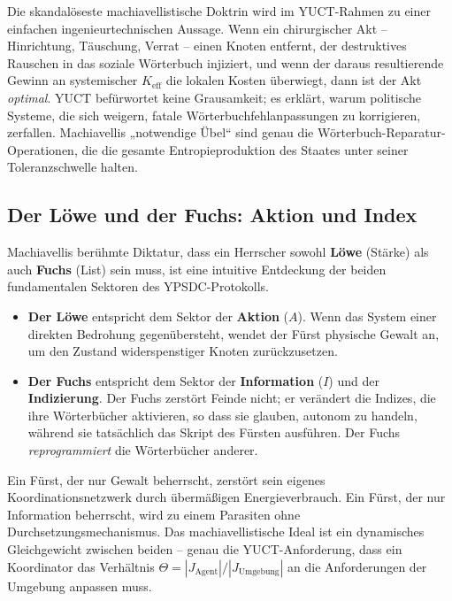 \documentclass[12pt,a4paper]{article}
\begin{document}
	Die skandalöseste machiavellistische Doktrin wird im YUCT-Rahmen zu einer einfachen ingenieurtechnischen Aussage. Wenn ein chirurgischer Akt – Hinrichtung, Täuschung, Verrat – einen Knoten entfernt, der destruktives Rauschen in das soziale Wörterbuch injiziert, und wenn der daraus resultierende Gewinn an systemischer \(K_{\mathrm{eff}}\) die lokalen Kosten überwiegt, dann ist der Akt \emph{optimal}. YUCT befürwortet keine Grausamkeit; es erklärt, warum politische Systeme, die sich weigern, fatale Wörterbuchfehlanpassungen zu korrigieren, zerfallen. Machiavellis „notwendige Übel“ sind genau die Wörterbuch-Reparatur-Operationen, die die gesamte Entropieproduktion des Staates unter seiner Toleranzschwelle halten.
	
	\subsection{Der Löwe und der Fuchs: Aktion und Index}
	
	Machiavellis berühmte Diktatur, dass ein Herrscher sowohl \textbf{Löwe} (Stärke) als auch \textbf{Fuchs} (List) sein muss, ist eine intuitive Entdeckung der beiden fundamentalen Sektoren des YPSDC-Protokolls.
	
	\begin{itemize}[leftmargin=*]
		\item \textbf{Der Löwe} entspricht dem Sektor der \textbf{Aktion} (\(A\)). Wenn das System einer direkten Bedrohung gegenübersteht, wendet der Fürst physische Gewalt an, um den Zustand widerspenstiger Knoten zurückzusetzen.
		\item \textbf{Der Fuchs} entspricht dem Sektor der \textbf{Information} (\(I\)) und der \textbf{Indizierung}. Der Fuchs zerstört Feinde nicht; er verändert die Indizes, die ihre Wörterbücher aktivieren, so dass sie glauben, autonom zu handeln, während sie tatsächlich das Skript des Fürsten ausführen. Der Fuchs \emph{reprogrammiert} die Wörterbücher anderer.
	\end{itemize}
	
	Ein Fürst, der nur Gewalt beherrscht, zerstört sein eigenes Koordinationsnetzwerk durch übermäßigen Energieverbrauch. Ein Fürst, der nur Information beherrscht, wird zu einem Parasiten ohne Durchsetzungsmechanismus. Das machiavellistische Ideal ist ein dynamisches Gleichgewicht zwischen beiden – genau die YUCT-Anforderung, dass ein Koordinator das Verhältnis \(\Theta = |J_{\mathrm{Agent}}|/|J_{\mathrm{Umgebung}}|\) an die Anforderungen der Umgebung anpassen muss.
	
\end{document}
